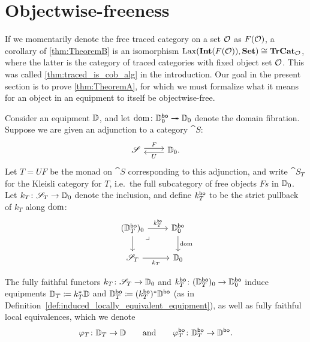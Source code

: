 \documentclass[11pt,oneside,article]{memoir}
\begin{document}
\section{Objectwise-freeness}
  \label{sec:monoids_on_free}

If we momentarily denote the free traced category on a set $\mathcal{O}$ as $F(\mathcal{O})$, a corollary of
\ref{thm:TheoremB} is an isomorphism $\operatorname{Lax}(\mathbf{Int}(F(\mathcal{O})),\mathbf{Set})\cong\mathbf{TrCat}_{\mathcal{O}}$, where the
latter is the category of traced categories with fixed object set $\mathcal{O}$. This was called
\ref{thm:traced_is_cob_alg} in the introduction. Our goal in the present section is to prove
\ref{thm:TheoremA}, for which we must formalize what it means for an object in an equipment to
itself be objectwise-free.

Consider an equipment $\mathbb{D}$, and let $\operatorname{dom}\colon\mathbb{D}_0^{\mathsf{bo}}\twoheadrightarrow\mathbb{D}_0$ denote the
domain fibration. Suppose we are given an adjunction to a category $\cat{S}$:
\begin{equation*}
  \Adjoint{\cat{S}}{\dcat{D}_0.}{F}{U}
\end{equation*}
Let $T=UF$ be the monad on $\cat{S}$ corresponding to this adjunction, and write $\cat{S}_T$ for the
Kleisli category for $T$, i.e.\ the full subcategory of free objects $Fs$ in $\mathbb{D}_0$. Let
$k_T\colon\mathscr{S}_T\to\mathbb{D}_0$ denote the inclusion, and define $k_T^{\mathsf{bo}}$ to be the strict
pullback of $k_T$ along $\operatorname{dom}$:
\[ \begin{tikzcd}
  (\dcat{D}_T^{\bo})_0 \ar[d] \ar[dr,phantom,"\lrcorner" very near start] \ar[r,"k_T^{\bo}"]
    &\dcat{D}_0^{\bo} \ar[d,"\dom"] \\
  \cat{S}_T \ar[r,"k_T"']
    & \dcat{D}_0
\end{tikzcd} \]

\begin{definition}
    \label{def:kleisli_equipment}
  The fully faithful functors $k_T\colon\mathscr{S}_T\to\mathbb{D}_0$ and
  $k_T^{\mathsf{bo}}\colon(\mathbb{D}_T^{\mathsf{bo}})_0\to\mathbb{D}_0^{\mathsf{bo}}$ induce equipments $\mathbb{D}_T\coloneqq
  k_T^*\mathbb{D}$ and $\mathbb{D}_T^{\mathsf{bo}}\coloneqq (k_T^{\mathsf{bo}})^*\mathbb{D}^{\mathsf{bo}}$ (as in
  Definition~\ref{def:induced_locally_equivalent_equipment}), as well as fully faithful local
  equivalences, which we denote
  \begin{equation}
      \label{eqn:FFLE_DT}
    \varphi_T\colon \mathbb{D}_T\to\mathbb{D}
    \qquad \text{and} \qquad
    \varphi_T^{\mathsf{bo}}\colon \mathbb{D}_T^{\mathsf{bo}}\to\mathbb{D}^{\mathsf{bo}}.
  \end{equation}
\end{definition}
\end{document}
